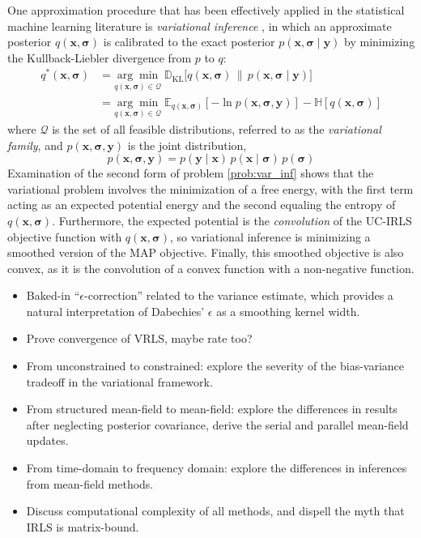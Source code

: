 \documentclass[final,5p,times,twocolumn]{elsarticle}
\newcommand{\m}[1]{\boldsymbol{#1}}
\newcommand{\E}[2]{\mathbb{E}_{#2}\left[ #1 \right]}
\newcommand{\entropy}[1]{\mathbb{H}\left[ #1 \right]}
\begin{document}
One approximation procedure that has been effectively applied in the
statistical machine learning literature is \emph{variational inference}
\cite{bishop2007}, in which an approximate posterior
$q(\m{x}, \m{\sigma})$ is calibrated to the exact posterior
$p(\m{x}, \m{\sigma} \mid \m{y})$ by minimizing the
Kullback-Liebler divergence from $p$ to $q$:
\begin{equation}
\begin{aligned}
q^*(\m{x}, \m{\sigma}) &=
 \underset{q(\m{x}, \m{\sigma}) \in \mathcal{Q}}{\arg\min} \;
 \mathbb{D}_{\text{KL}}\big[
  q(\m{x}, \m{\sigma}) \,\big\|\, p(\m{x}, \m{\sigma} \mid \m{y})
 \big]
\\ &=
 \underset{q(\m{x}, \m{\sigma}) \in \mathcal{Q}}{\arg\min} \;
 \E{-\ln p(\m{x}, \m{\sigma}, \m{y})}{q(\m{x}, \m{\sigma})} -
 \entropy{q(\m{x}, \m{\sigma})}
\end{aligned}
\label{prob:var_inf}
\end{equation}
where $\mathcal{Q}$ is the set of all feasible distributions, referred to
as the \emph{variational family}, and $p(\m{x}, \m{\sigma}, \m{y})$ is
the joint distribution,
\begin{equation}
p(\m{x}, \m{\sigma}, \m{y}) =
 p(\m{y} \mid \m{x}) \,
 p(\m{x} \mid \m{\sigma}) \,
 p(\m{\sigma})
\label{eq:joint}
\end{equation}
Examination of the second form of problem \eqref{prob:var_inf} shows
that the variational problem involves the minimization of a free
energy, with the first term acting as an expected potential energy
and the second equaling the entropy of $q(\m{x}, \m{\sigma})$.
Furthermore, the expected potential is the \emph{convolution} of
the UC-IRLS objective function with $q(\m{x}, \m{\sigma})$, so
variational inference is minimizing a smoothed version of the
MAP objective. Finally, this smoothed objective is also convex,
as it is the convolution of a convex function with a non-negative
function.

\begin{itemize}
 \item Baked-in ``$\epsilon$-correction'' related to the variance
  estimate, which provides a natural interpretation of Dabechies'
  $\epsilon$ as a smoothing kernel width.
 \item Prove convergence of VRLS, maybe rate too?
 \item From unconstrained to constrained: explore the severity of
  the bias-variance tradeoff in the variational framework.
 \item From structured mean-field to mean-field: explore the
  differences in results after neglecting posterior covariance,
  derive the serial and parallel mean-field updates.
 \item From time-domain to frequency domain: explore the differences
  in inferences from mean-field methods.
 \item Discuss computational complexity of all methods, and
  dispell the myth that IRLS is matrix-bound.
\end{itemize}
\end{document}
